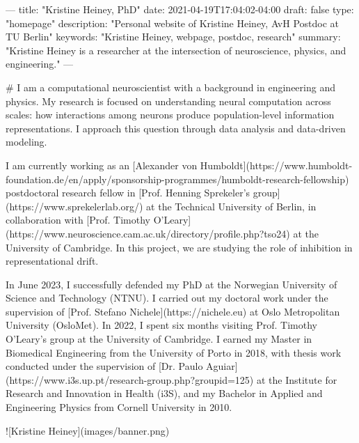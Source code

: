 ---
title: "Kristine Heiney, PhD"
date: 2021-04-19T17:04:02-04:00
draft: false
type: "homepage"
description: "Personal website of Kristine Heiney, AvH Postdoc at TU Berlin"
keywords: "Kristine Heiney, webpage, postdoc, research"
summary: "Kristine Heiney is a researcher at the intersection of neuroscience, physics, and engineering."
---

#
I am a computational neuroscientist with a background in engineering and physics. My research is focused on understanding neural computation across scales: how interactions among neurons produce population-level information representations. I approach this question through data analysis and data-driven modeling.  

I am currently working as an [Alexander von Humboldt](https://www.humboldt-foundation.de/en/apply/sponsorship-programmes/humboldt-research-fellowship) postdoctoral research fellow in [Prof. Henning Sprekeler's group](https://www.sprekelerlab.org/) at the Technical University of Berlin, in collaboration with [Prof. Timothy O'Leary](https://www.neuroscience.cam.ac.uk/directory/profile.php?tso24) at the University of Cambridge. In this project, we are studying the role of inhibition in representational drift.  

In June 2023, I successfully defended my PhD at the Norwegian University of Science and Technology (NTNU). I carried out my doctoral work under the supervision of [Prof. Stefano Nichele](https://nichele.eu) at Oslo Metropolitan University (OsloMet). In 2022, I spent six months visiting Prof. Timothy O'Leary's group at the University of Cambridge. I earned my Master in Biomedical Engineering from the University of Porto in 2018, with thesis work conducted under the supervision of [Dr. Paulo Aguiar](https://www.i3s.up.pt/research-group.php?groupid=125) at the Institute for Research and Innovation in Health (i3S), and my Bachelor in Applied and Engineering Physics from Cornell University in 2010.  

![Kristine Heiney](images/banner.png)